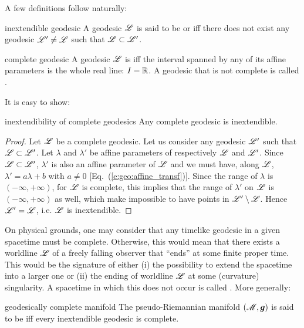 A few definitions follow naturally:

\begin{tdef}{inextendible geodesic}{}
A geodesic $\mathscr{L}$ is said to be 
or 
iff there does not exist any geodesic $\mathscr{L}'\neq\mathscr{L}$ such that $\mathscr{L}\subset\mathscr{L}'$.
\end{tdef}

\begin{tdef}{complete geodesic}{}
A geodesic $\mathscr{L}$ is 
iff the interval spanned by any of its affine parameters is the whole real line:
$I=\mathbb{R}$. A geodesic that is not complete is called .
\end{tdef}

It is easy to show:
\begin{tprop}{inextendibility of complete geodesics}{}
Any complete geodesic is inextendible.
\end{tprop}

\begin{proof}
Let $\mathscr{L}$ be a complete geodesic.
Let us consider any geodesic $\mathscr{L}'$ such that $\mathscr{L}\subset \mathscr{L}'$.
Let $\lambda$ and $\lambda'$ be affine parameters of respectively $\mathscr{L}$
and $\mathscr{L}'$. Since $\mathscr{L}\subset \mathscr{L}'$, $\lambda'$ is also an affine parameter
of $\mathscr{L}$ and we must have, along $\mathscr{L}$,
$\lambda' = a \lambda + b$ with $a\not=0$ [Eq.~(\ref{e:geo:affine_transf})].
Since the range of $\lambda$ is $(-\infty,+\infty)$, for $\mathscr{L}$ is complete,
this implies that the range of $\lambda'$ on $\mathscr{L}$ is $(-\infty,+\infty)$
as well, which make impossible to have points in $\mathscr{L}'\setminus\mathscr{L}$.
Hence $\mathscr{L}'=\mathscr{L}$, i.e. $\mathscr{L}$ is inextendible.
\end{proof}


On physical grounds, one may consider that any timelike geodesic in a given
spacetime must be complete. Otherwise, this would mean that there exists a worldline
$\mathscr{L}$ of a freely falling observer that ``ends'' at some finite proper time. This
would be the signature of either (i) the possibility to extend the spacetime into
a larger one or (ii) the ending of worldline $\mathscr{L}$ at some (curvature)
singularity. A spacetime in which this does not occur
is called .
More generally:
\begin{tdef}{geodesically complete manifold}{}
The pseudo-Riemannian manifold $(\mathscr{M},\bm{g})$ is said to be
iff every inextendible geodesic is complete.
\end{tdef}

